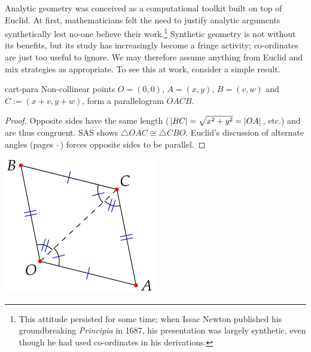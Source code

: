Analytic geometry was conceived as a computational toolkit built on top of Euclid. At first, mathematicians felt the need to justify analytic arguments synthetically lest no-one believe their work.\footnote{This attitude persisted for some time; when Issac Newton published his groundbreaking \emph{Principia} in 1687, his presentation was largely synthetic, even though he had used co-ordinates in his derivations.} Synthetic geometry is not without its benefits, but its study has increasingly become a fringe activity; co-ordinates are just too useful to ignore.\smallbreak
We may therefore assume anything from Euclid and mix strategies as appropriate. To see this at work, consider a simple result.

\begin{minipage}[t]{0.74\linewidth}\vspace{0pt}
\begin{lemm}{}{cart-para}
Non-collinear points $O=(0,0)$, $A=(x,y)$, $B=(v,w)$ and $C:=(x+v,y+w)$, form a parallelogram $OACB$.
\end{lemm}

\begin{proof}
Opposite sides have the same length ($\left| BC\right|=\sqrt{x^2+y^2}=\left| OA\right|$, etc.) and are thus congruent. SAS shows $\triangle OAC\cong \triangle CBO$. Euclid's discussion of alternate angles (pages \pageref{defn:parallel}--\pageref*{axiom:playfair}) forces opposite sides to be parallel.
\end{proof}
\end{minipage}\hfill
\begin{minipage}[t]{0.25\linewidth}\vspace{0pt}
\flushright\includegraphics[scale=0.9]{analytic-para}
\end{minipage}

\goodbreak


\iffalse
{}

